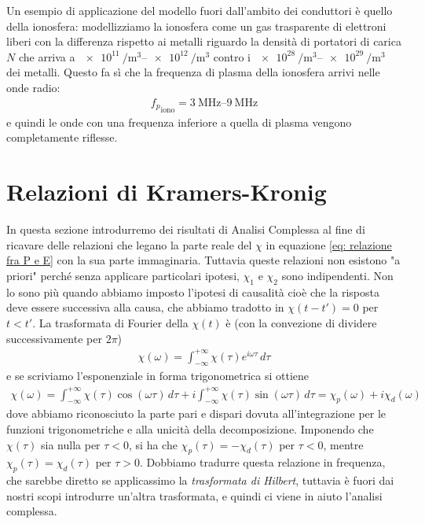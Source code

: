 Un esempio di applicazione del modello fuori dall'ambito dei conduttori è quello della ionosfera: modellizziamo la ionosfera come un gas trasparente 
di elettroni liberi con la differenza rispetto ai metalli riguardo la densità di portatori di carica $ N $ che arriva a 
$ \SIrange{e11}{e12}{\per\cubic\metre} $ contro i $ \SIrange{e28}{e29}{\per\cubic\metre} $ dei metalli. Questo fa sì che la frequenza di plasma 
della ionosfera arrivi nelle onde radio:
\begin{align}
  {f_p}_{\text{iono}} = \SIrange{3}{9}{\MHz}
\end{align}
e quindi le onde con una frequenza inferiore a quella di plasma vengono completamente riflesse.

\section{Relazioni di Kramers-Kronig}
In questa sezione introdurremo dei risultati di Analisi Complessa al fine di ricavare delle relazioni che legano la parte reale del $ \chi $ in 
equazione \eqref{eq: relazione fra P e E} con la sua parte immaginaria. Tuttavia queste relazioni non esistono "a priori" perché senza applicare 
particolari ipotesi, $ \chi_1 $ e $ \chi_2 $ sono indipendenti. Non lo sono più quando abbiamo imposto l'ipotesi di causalità cioè che la risposta 
deve essere successiva alla causa, che abbiamo tradotto in $ \chi(t - t') = 0 $ per $ t < t' $. La trasformata di Fourier della $ \chi(t) $ è 
(con la convezione di dividere successivamente per $ 2\pi $)
\begin{align}
  \chi(\omega) = \int_{-\infty}^{+\infty} \chi(\tau) e^{i\omega \tau} \,d\tau
\end{align}
e se scriviamo l'esponenziale in forma trigonometrica si ottiene
\begin{align}
  \chi(\omega) = \int_{-\infty}^{+\infty} \chi(\tau) \cos(\omega \tau) \,d\tau + i \int_{-\infty}^{+\infty} \chi(\tau) \sin(\omega \tau) \,d\tau 
  = \chi_p(\omega) + i \chi_d(\omega)
\end{align}
dove abbiamo riconosciuto la parte pari e dispari dovuta all'integrazione per le funzioni trigonometriche e alla unicità della decomposizione. Imponendo 
che $ \chi(\tau) $ sia nulla per $ \tau < 0 $, si ha che $ \chi_p(\tau) = - \chi_d(\tau) $ per $ \tau < 0 $, mentre $ \chi_p(\tau) = \chi_d (\tau) $ per 
$ \tau > 0 $. Dobbiamo tradurre questa relazione in frequenza, che sarebbe diretto se applicassimo la \textit{trasformata di Hilbert}, tuttavia è fuori dai 
nostri scopi introdurre un'altra trasformata, e quindi ci viene in aiuto l'analisi complessa. 
